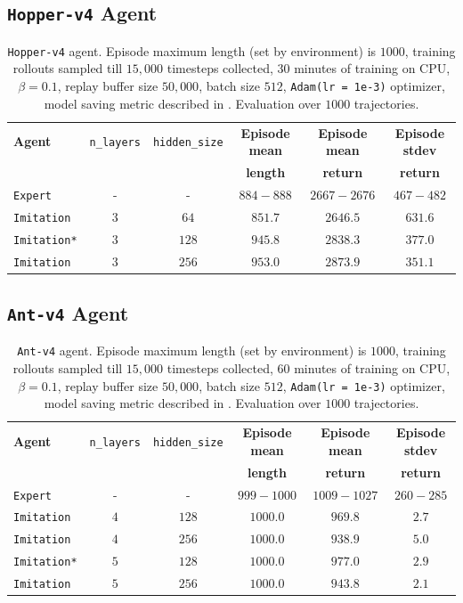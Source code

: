 \subsection{\texttt{Hopper-v4} Agent}
\begin{table}[H]
\centering
\begin{tabular}{lccccc}
\hline
\textbf{Agent} &
\texttt{n\_layers} &
\texttt{hidden\_size} &
\textbf{Episode mean} & \textbf{Episode mean} & \textbf{Episode stdev} \\
&
&
&
\textbf{length} &
\textbf{return} &
\textbf{return} \\
\hline
\texttt{Expert} & -  & - & $884-888$ & $2667-2676$ & $467-482$\\
\texttt{Imitation}  & $3$  & $64$ & $851.7$ & $2646.5$ & $631.6$\\
\texttt{Imitation*}  & $3$  & $128$ & $945.8$ & $2838.3$ & $377.0$\\
\texttt{Imitation}  & $3$  & $256$ & $953.0$ & $ 2873.9$ & $351.1$\\
\hline
\end{tabular}
\caption{\texttt{Hopper-v4} agent. Episode maximum length (set by environment) is $1000$, training rollouts sampled till $15,000$ timesteps collected, $30$ minutes of training on CPU,  $\beta = 0.1$, replay buffer size $50,000$, batch size $512$, \texttt{Adam(lr = 1e-3)} optimizer, model saving metric described in . Evaluation over $1000$ trajectories.}
\label{tab:hopper-v4-metrics}
\end{table}
\subsection{\texttt{Ant-v4} Agent}
\begin{table}[H]
\centering
\begin{tabular}{lccccc}
\hline
\textbf{Agent} &
\texttt{n\_layers} &
\texttt{hidden\_size} &
\textbf{Episode mean} & \textbf{Episode mean} & \textbf{Episode stdev} \\
&
&
&
\textbf{length} &
\textbf{return} &
\textbf{return} \\
\hline
\texttt{Expert} & -  & - & $999-1000$ & $1009-1027$ & $260-285$\\
\texttt{Imitation}  & $4$  & $128$ & $1000.0$ & $969.8$ & $2.7$\\
\texttt{Imitation}  & $4$  & $256$ & $1000.0$ & $938.9$ & $5.0$\\
\texttt{Imitation*} & $5$  & $128$ & $1000.0$ & $977.0$ & $2.9$\\
\texttt{Imitation}  & $5$  & $256$ & $1000.0$ & $943.8$ & $2.1$\\
\hline
\end{tabular}
\caption{\texttt{Ant-v4} agent. Episode maximum length (set by environment) is $1000$, training rollouts sampled till $15,000$ timesteps collected, $60$ minutes of training on CPU,  $\beta = 0.1$, replay buffer size $50,000$, batch size $512$, \texttt{Adam(lr = 1e-3)} optimizer, model saving metric described in . Evaluation over $1000$ trajectories.}
\label{tab:ant-v4-metrics}
\end{table}
